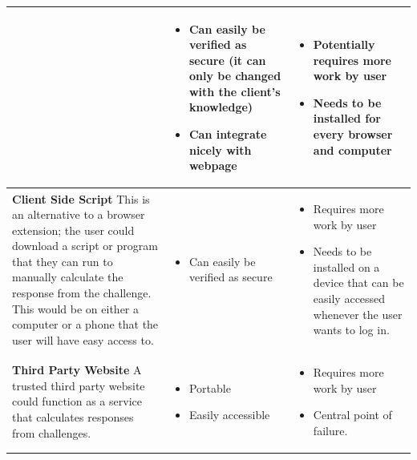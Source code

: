 \documentclass[11pt]{article}
\begin{document}
\begin{center}
\begin{tabular}{|  p{6cm} | p{5cm} | p{5cm} |}
    &
    \begin{itemize}[leftmargin=*]
    \item Can easily be verified as secure (it can only be changed with the client's knowledge)

    \item Can integrate nicely with webpage
    \end{itemize}
    &
    \begin{itemize}[leftmargin=*]
    \item Potentially requires more work by user

    \item Needs to be installed for every browser and computer
    \end{itemize}

    \\ \hline
    \vspace{.4cm}
    \textbf{Client Side Script}
    This is an alternative to a browser extension; the user could download a script or program that they can run to manually calculate the response from the challenge. This would be on either a computer or a phone that the user will have easy access to.

    &
    \begin{itemize}[leftmargin=*]
      \item Can easily be verified as secure
    \end{itemize}

    &
    
    \begin{itemize}[leftmargin=*]
    \item Requires more work by user
    \item Needs to be installed on a device that can be easily accessed whenever the user wants to log in.
    \end{itemize}        

    \\ \hline
    \vspace{.4cm}
    \textbf{Third Party Website}
    A trusted third party website could function as a service that calculates responses from challenges.
    &

    \begin{itemize}[leftmargin=*]
      \item Portable
      \item Easily accessible
    \end{itemize}

    &

    \begin{itemize}[leftmargin=*]
      \item Requires more work by user
      \item Central point of failure.
    \end{itemize}
    
    \\ \hline
    
    \end{tabular}
\end{center}
\end{document}
